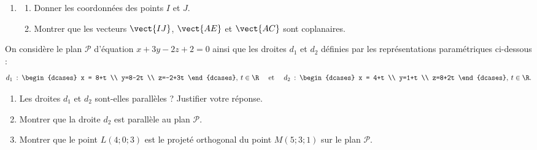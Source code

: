 \begin{enumerate}[resume]
	\item
	\begin{enumerate}
		\item Donner les coordonnées des points $I$ et $J$.
		\item Montrer que les vecteurs $\vect{IJ}$, $\vect{AE}$ et $\vect{AC}$ sont coplanaires. 
	\end{enumerate}
\end{enumerate}

On considère le plan $\mathcal{P}$ d’équation $x+3y-2z+2=0$ ainsi que les droites $d_1$ et $d_2$ définies par les représentations paramétriques ci-dessous : \[ d_1 \: : \: \begin{dcases} x = 8+t \\ y=8-2t \\ z=-2+3t \end{dcases}, \: t \in \R \quad \text{ et } \quad d_2 \: : \: \begin{dcases} x = 4+t \\ y=1+t \\ z=8+2t \end{dcases}, \: t \in \R. \]

\begin{enumerate}[resume]
	\item Les droites $d_1$ et $d_2$ sont-elles parallèles ? Justifier votre réponse.
	\item Montrer que la droite $d_2$ est parallèle au plan $\mathcal{P}$.
	\item Montrer que le point $L(4;0;3)$ est le projeté orthogonal du point $M(5;3;1)$ sur le plan $\mathcal{P}$.
\end{enumerate}

